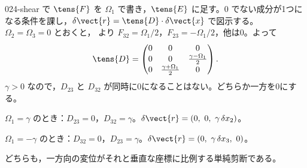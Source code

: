 \documentclass[uplatex,dvipdfmx,a4paper,11pt]{jsarticle}
\begin{document}
\begin{kaisetsu}{024-shear}
\houshin {} で $\tens{F}$ を $\Omega_1$ で書き，$\tens{E}$ に足す。0 でない成分が1つになる条件を課し，$\delta\vect{r}=\tens{D}\cdot\delta\vect{x}$ で図示する。
\keisan {} $\Omega_2=\Omega_3=0$ とおくと， より $F_{32}=\Omega_1/2$，$F_{23}=-\Omega_1/2$，他は0。よって
\[ \tens{D}=\begin{pmatrix} 0 & 0 & 0\\ 0 & 0 & \frac{\gamma-\Omega_1}{2}\\ 0 & \frac{\gamma+\Omega_1}{2} & 0 \end{pmatrix}. \]
 $\gamma>0$ なので，$D_{23}$ と $D_{32}$ が同時に0になることはない。どちらか一方を0にする。

$\Omega_1=\gamma$ のとき：$D_{23}=0$，$D_{32}=\gamma$。$\delta\vect{r}=(0,\ 0,\ \gamma\,\delta x_2)$。

$\Omega_1=-\gamma$ のとき：$D_{32}=0$，$D_{23}=\gamma$。$\delta\vect{r}=(0,\ \gamma\,\delta x_3,\ 0)$。

どちらも，一方向の変位がそれと垂直な座標に比例する単純剪断である。


\end{kaisetsu}
\end{document}
